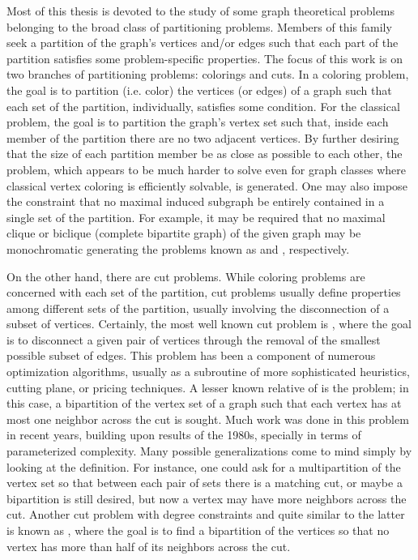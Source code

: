 Most of this thesis is devoted to the study of some graph theoretical problems belonging to the broad class of partitioning problems.
Members of this family seek a partition of the graph's vertices and/or edges such that each part of the partition satisfies some problem-specific properties.
The focus of this work is on two branches of partitioning problems: colorings and cuts.
In a coloring problem, the goal is to partition (i.e. color) the vertices (or edges) of a graph such that each set of the partition, individually, satisfies some condition.
For the classical  problem, the goal is to partition the graph's vertex set such that, inside each member of the partition there are no two adjacent vertices.
By further desiring that the size of each partition member be as close as possible to each other, the  problem, which appears to be much harder to solve even for graph classes where classical vertex coloring is efficiently solvable, is generated.
One may also impose the constraint that no maximal induced subgraph be entirely contained in a single set of the partition.
For example, it may be required that no maximal clique or biclique (complete bipartite graph) of the given graph may be monochromatic generating the problems known as  and , respectively.

On the other hand, there are cut problems.
While coloring problems are concerned with each set of the partition, cut problems usually define properties among different sets of the partition, usually involving the disconnection of a subset of vertices.
Certainly, the most well known cut problem is , where the goal is to disconnect a given pair of vertices through the removal of the smallest possible subset of edges.
This problem has been a component of numerous optimization algorithms, usually as a subroutine of more sophisticated heuristics, cutting plane, or pricing techniques.
A lesser known relative of  is the  problem; in this case, a bipartition of the vertex set of a graph such that each vertex has at most one neighbor across the cut is sought.
Much work was done in this problem in recent years, building upon results of the 1980s, specially in terms of parameterized complexity.
Many possible generalizations come to mind simply by looking at the definition.
For instance, one could ask for a multipartition of the vertex set so that between each pair of sets there is a matching cut, or maybe a bipartition is still desired, but now a vertex may have more neighbors across the cut.
Another cut problem with degree constraints and quite similar to the latter is known as , where the goal is to find a bipartition of the vertices so that no vertex has more than half of its neighbors across the cut.

